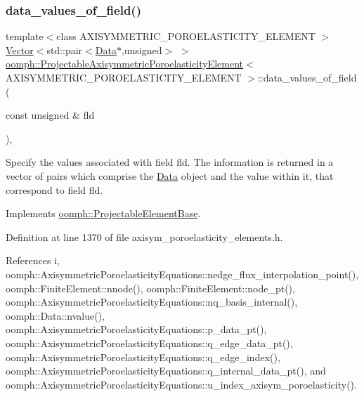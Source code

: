 \subsubsection{\texorpdfstring{data\+\_\+values\+\_\+of\+\_\+field()}{data\_values\_of\_field()}}
{\footnotesize\ttfamily template$<$class A\+X\+I\+S\+Y\+M\+M\+E\+T\+R\+I\+C\+\_\+\+P\+O\+R\+O\+E\+L\+A\+S\+T\+I\+C\+I\+T\+Y\+\_\+\+E\+L\+E\+M\+E\+NT $>$ \\
\hyperlink{classoomph_1_1Vector}{Vector}$<$std\+::pair$<$\hyperlink{classoomph_1_1Data}{Data}$\ast$,unsigned$>$ $>$ \hyperlink{classoomph_1_1ProjectableAxisymmetricPoroelasticityElement}{oomph\+::\+Projectable\+Axisymmetric\+Poroelasticity\+Element}$<$ A\+X\+I\+S\+Y\+M\+M\+E\+T\+R\+I\+C\+\_\+\+P\+O\+R\+O\+E\+L\+A\+S\+T\+I\+C\+I\+T\+Y\+\_\+\+E\+L\+E\+M\+E\+NT $>$\+::data\+\_\+values\+\_\+of\+\_\+field (\begin{DoxyParamCaption}\item[{const unsigned \&}]{fld }\end{DoxyParamCaption})\hspace{0.3cm}{\ttfamily [inline]}, {\ttfamily [virtual]}}



Specify the values associated with field fld. The information is returned in a vector of pairs which comprise the \hyperlink{classoomph_1_1Data}{Data} object and the value within it, that correspond to field fld. 



Implements \hyperlink{classoomph_1_1ProjectableElementBase_a644306ebdf16f334344c2d27d72f18b7}{oomph\+::\+Projectable\+Element\+Base}.



Definition at line 1370 of file axisym\+\_\+poroelasticity\+\_\+elements.\+h.



References i, oomph\+::\+Axisymmetric\+Poroelasticity\+Equations\+::nedge\+\_\+flux\+\_\+interpolation\+\_\+point(), oomph\+::\+Finite\+Element\+::nnode(), oomph\+::\+Finite\+Element\+::node\+\_\+pt(), oomph\+::\+Axisymmetric\+Poroelasticity\+Equations\+::nq\+\_\+basis\+\_\+internal(), oomph\+::\+Data\+::nvalue(), oomph\+::\+Axisymmetric\+Poroelasticity\+Equations\+::p\+\_\+data\+\_\+pt(), oomph\+::\+Axisymmetric\+Poroelasticity\+Equations\+::q\+\_\+edge\+\_\+data\+\_\+pt(), oomph\+::\+Axisymmetric\+Poroelasticity\+Equations\+::q\+\_\+edge\+\_\+index(), oomph\+::\+Axisymmetric\+Poroelasticity\+Equations\+::q\+\_\+internal\+\_\+data\+\_\+pt(), and oomph\+::\+Axisymmetric\+Poroelasticity\+Equations\+::u\+\_\+index\+\_\+axisym\+\_\+poroelasticity().

